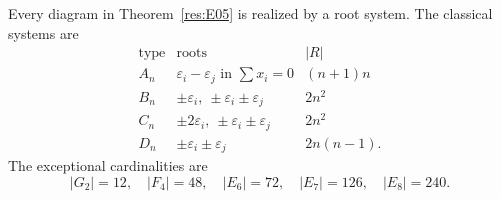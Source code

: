 \begin{theorem}\label{res:E06}
Every diagram in Theorem~\ref{res:E05} is realized by a root
system. The classical systems are
\[
\begin{array}{c|l|r}
\text{type}&\text{roots}&|R|\\\hline
A_n&\varepsilon_i-\varepsilon_j\text{ in }\sum x_i=0
 &(n+1)n\\
B_n&\pm\varepsilon_i,\ \pm\varepsilon_i\pm\varepsilon_j&2n^2\\
C_n&\pm2\varepsilon_i,\ \pm\varepsilon_i\pm\varepsilon_j&2n^2\\
D_n&\pm\varepsilon_i\pm\varepsilon_j&2n(n-1).
\end{array}
\]
The exceptional cardinalities are
\[
 |G_2|=12,\quad |F_4|=48,\quad
 |E_6|=72,\quad |E_7|=126,\quad |E_8|=240.
\]
\end{theorem}
